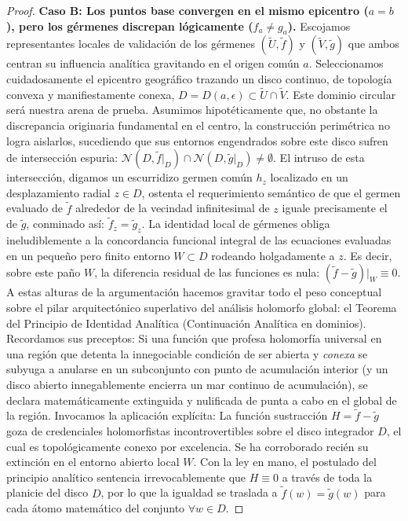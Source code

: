 \documentclass[11pt,a4paper]{article}
\theoremstyle{definition}
\theoremstyle{remark}
\numberwithin{equation}{section}
\begin{document}
\begin{proof}
\textbf{Caso B: Los puntos base convergen en el mismo epicentro ($a = b$), pero los gérmenes discrepan lógicamente ($f_a \neq g_a$).}
Escojamos representantes locales de validación de los gérmenes $(\widetilde{U}, \widetilde{f})$ y $(\widetilde{V}, \widetilde{g})$ que ambos centran su influencia analítica gravitando en el origen común $a$. Seleccionamos cuidadosamente el epicentro geográfico trazando un disco continuo, de topología convexa y manifiestamente conexa, $D = D(a, \epsilon) \subset \widetilde{U} \cap \widetilde{V}$. Este dominio circular será nuestra arena de prueba.
Asumimos hipotéticamente que, no obstante la discrepancia originaria fundamental en el centro, la construcción perimétrica no logra aislarlos, sucediendo que sus entornos engendrados sobre este disco sufren de intersección espuria: $\mathcal{N}(D, \widetilde{f}|_{D}) \cap \mathcal{N}(D, \widetilde{g}|_{D}) \neq \emptyset$.
El intruso de esta intersección, digamos un escurridizo germen común $h_z$ localizado en un desplazamiento radial $z \in D$, ostenta el requerimiento semántico de que el germen evaluado de $\widetilde{f}$ alrededor de la vecindad infinitesimal de $z$ iguale precisamente el de $\widetilde{g}$, conminado así: $\widetilde{f}_z = \widetilde{g}_z$.
La identidad local de gérmenes obliga ineludiblemente a la concordancia funcional integral de las ecuaciones evaluadas en un pequeño pero finito entorno $W \subset D$ rodeando holgadamente a $z$. Es decir, sobre este paño $W$, la diferencia residual de las funciones es nula: $(\widetilde{f} - \widetilde{g})|_{W} \equiv 0$.
A estas alturas de la argumentación hacemos gravitar todo el peso conceptual sobre el pilar arquitectónico superlativo del análisis holomorfo global: el Teorema del Principio de Identidad Analítica (Continuación Analítica en dominios). Recordamos sus preceptos: Si una función que profesa holomorfía universal en una región que detenta la innegociable condición de ser abierta y \textit{conexa} se subyuga a anularse en un subconjunto con punto de acumulación interior (y un disco abierto innegablemente encierra un mar continuo de acumulación), se declara matemáticamente extinguida y nulificada de punta a cabo en el global de la región.
Invocamos la aplicación explícita: La función sustracción $H = \widetilde{f} - \widetilde{g}$ goza de credenciales holomorfistas incontrovertibles sobre el disco integrador $D$, el cual es topológicamente conexo por excelencia. Se ha corroborado recién su extinción en el entorno abierto local $W$. Con la ley en mano, el postulado del principio analítico sentencia irrevocablemente que $H \equiv 0$ a través de toda la planicie del disco $D$, por lo que la igualdad se traslada a $\widetilde{f}(w) = \widetilde{g}(w)$ para cada átomo matemático del conjunto $\forall w \in D$.

\end{proof}
\end{document}
